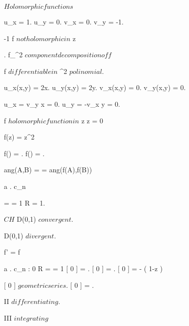 \documentclass[../Main/main]{subfiles}
\begin{document}
\unit{ $ Holomorphic functions $ }
{
	
	{
		{
		}
		{
			u_x = 1.
			u_y = 0.
			v_x = 0.
			v_y = -1.

			{
				-1  \imp f $ not holomorphic in $ z
			}
		}
	}


	{
		{
			.
			f_{\R^2} $ component decomposition of f $
		}
		{
			f $ differentiable in $ \R^2 $ polinomial $.
			{
				u_x(x,y) = 2x.
				u_y(x,y) = 2y.
				v_x(x,y) = 0.
				v_y(x,y) = 0.

				u_x = v_y \ifandonlyif x = 0.
				u_y = -v_x \ifandonlyif y = 0.

				f $ holomorphic function in $ z \ifandonlyif z = 0
			}
		}
	}


	{
		{
			f(z) = z^2
		}
		{
			f() = .
			f() = .

			ang(A,B) = \pi {} = ang(f(A),f(B))
		}
	}


	{
		{
			a .
			c_n \as {}
		}
		{
			 =  = 1 \imp R = 1.

			$CH$ \imp D(0,1) $ convergent $.

			\C \setminus D(0,1) $ divergent $.

			f' = f
		}
	}


	{
		{
			a .
			c_n : 0
		}
		{
			R =  = 1
		}
		\holds
		{
			[ 0 ] = .
			[ 0 ] = .
			[ 0 ] = - \log( 1-z )
		}
		\demonstration
		{
			{
				[ 0 ] $ geometric series $.
				[ 0 ] = 
			}.

			II $ differentiating $.

			III $ integrating $
		}
	}
	
}
\end{document}
